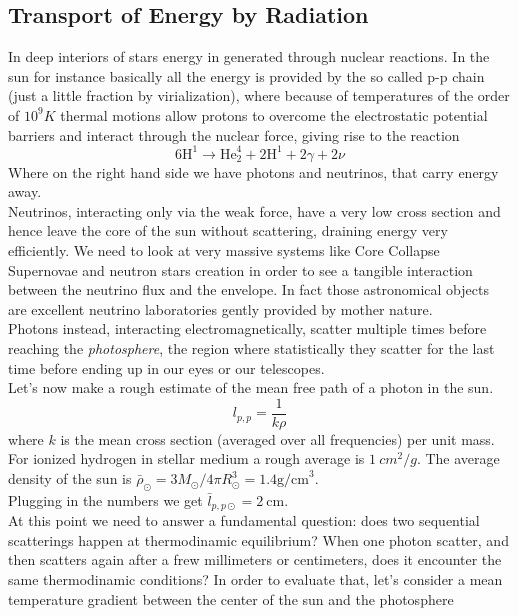 \documentclass[11pt]{article}
\numberwithin{equation}{section}
\begin{document}
\subsection{Transport of Energy by Radiation}
In deep interiors of stars energy in generated through nuclear reactions. In the sun for instance basically all the energy is provided by the so called p-p chain (just a little fraction by virialization), where because of temperatures of the order of $10^9 K$ thermal motions allow protons to overcome the electrostatic potential barriers and interact through the nuclear force, giving rise to the reaction
\begin{equation}\label{ppchain}
	6 \mathrm{H}^1 \to \mathrm{He}^4_2 + 2 \mathrm{H}^1 + 2 \gamma + 2 \nu
\end{equation}
Where on the right hand side we have photons and neutrinos, that carry energy away. \\
Neutrinos, interacting only via the weak force, have a very low cross section and hence leave the core of the sun without scattering, draining energy very efficiently. We need to look at very massive systems like Core Collapse Supernovae and neutron stars creation in order to see a tangible interaction between the neutrino flux and the envelope. In fact those astronomical objects are excellent neutrino laboratories gently provided by mother nature. \\
Photons instead, interacting electromagnetically, scatter multiple times before reaching the \textit{photosphere}, the region where statistically they scatter for the last time before ending up in our eyes or our telescopes. \\
Let's now make a rough estimate of the mean free path of a photon in the sun. 
\begin{equation}\label{mfp}
	l_{p,p}=\frac{1}{k \rho}
\end{equation}
where $k$ is the mean cross section (averaged over all frequencies) per unit mass. For ionized hydrogen in stellar medium a rough average is $1 \ cm^2/g$. The average density of the sun is $\bar\rho_{\odot}=3M_{\odot}/4 \pi R_{\odot}^3= 1.4 \mathrm{g /cm}^3$. \\
Plugging in the numbers we get $\bar l_{p,p \odot}=2 \  \mathrm{cm}$. \\
At this point we need to answer a fundamental question: does two sequential scatterings happen at thermodinamic equilibrium? When one photon scatter, and then scatters again after a frew millimeters or centimeters, does it encounter the same thermodinamic conditions? In order to evaluate that, let's consider a mean temperature gradient between the center of the sun and the photosphere
\end{document}
